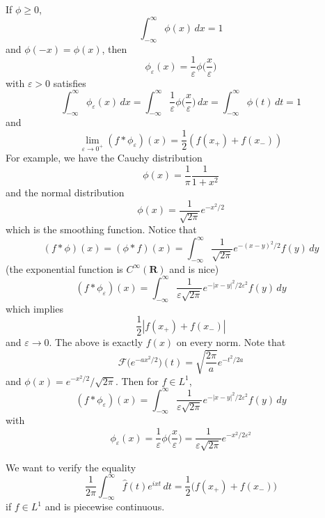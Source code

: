 \begin{rmk}
If $\phi \geq 0$, 
\[\int ^{\infty }_{-\infty }\phi (x)\,dx=1\]
and $\phi (-x)=\phi (x)$, then 
\[\phi _{\varepsilon }(x)=\dfrac{1}{\varepsilon }\phi \Big(\dfrac{x}{\varepsilon }\Big)\]
with $\varepsilon >0$ satisfies
\[\int ^{\infty }_{-\infty }\phi _{\varepsilon }(x)\,dx=\int ^{\infty }_{-\infty }\dfrac{1}{\varepsilon }\phi \Big(\dfrac{x}{\varepsilon }\Big)\,dx=\int ^{\infty }_{-\infty }\phi (t)\,dt=1\]
and
\[\lim _{\varepsilon \rightarrow 0^{+}}(f\ast \phi _{\varepsilon })(x)=\dfrac{1}{2}(f(x_{+})+f(x_{-}))\]
For example, we have the Cauchy distribution
\[\phi (x)=\dfrac{1}{\pi }\dfrac{1}{1+x^2}\]
and the normal distribution
\[\phi (x)=\dfrac{1}{\sqrt{2\pi }}e^{-x^2/2}\]
which is the smoothing function. Notice that
\[(f\ast \phi )(x)=(\phi \ast f)(x)=\int ^{\infty }_{-\infty }\dfrac{1}{\sqrt{2\pi }}e^{-(x-y)^2/2}f(y)\,dy\]
(the exponential function is $C^{\infty }({\bm R})$ and is nice) 
\[(f\ast \phi _{\varepsilon })(x)=\int ^{\infty }_{-\infty }\dfrac{1}{\varepsilon \sqrt{2\pi }}e^{-|x-y|^2/2\varepsilon ^2}f(y)\,dy\]
which implies
\[\dfrac{1}{2}|f(x_{+})+f(x_{-})|\]
and $\varepsilon \rightarrow 0$. The above is exactly $f(x)$ on every norm. Note that
\[\mathcal{F}\Big(e^{-ax^2/2}\Big)(t)=\sqrt{\dfrac{2\pi }{a}}e^{-t^2/2a}\]
and $\phi (x)=e^{-x^2/2}/\sqrt{2\pi }$. Then for $f\in L^{1}$,
\[(f\ast \phi _{\varepsilon })(x)=\int ^{\infty }_{-\infty }\dfrac{1}{\varepsilon \sqrt{2\pi }}e^{-|x-y|^2/2\varepsilon ^2}f(y)\,dy\]
with
\[\phi _{\varepsilon }(x)=\dfrac{1}{\varepsilon }\phi \Big(\dfrac{x}{\varepsilon }\Big)=\dfrac{1}{\varepsilon \sqrt{2\pi }}e^{-x^2/2\varepsilon ^2}\]
\end{rmk}
\vspace{2ex}
\begin{thm}
We want to verify the equality
\[\dfrac{1}{2\pi }\int ^{\infty }_{-\infty }\hat{f}(t)e^{ixt}\,dt=\dfrac{1}{2}\Big(f(x_{+})+f(x_{-})\Big)\]
if $f\in L^{1}$ and is piecewise continuous.
\end{thm}
\vspace{2ex}
